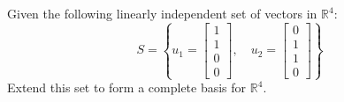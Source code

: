 \documentclass[11pt,a4paper]{article}
\begin{document}
\vspace{0.8cm}

\begin{questionbox}
Given the following linearly independent set of vectors in $\mathbb{R}^4$:
\[ S = \left\{ u_1 = \begin{bmatrix} 1 \\ 1 \\ 0 \\ 0 \end{bmatrix}, \quad u_2 = \begin{bmatrix} 0 \\ 1 \\ 1 \\ 0 \end{bmatrix} \right\} \]
Extend this set to form a complete basis for $\mathbb{R}^4$.
\end{questionbox}
\end{document}
